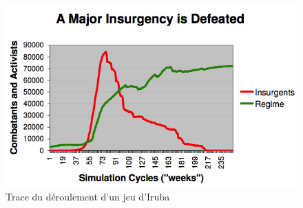 \documentclass{article}
\begin{document}
\begin{figure}[H]
	\begin{centering}
	\includegraphics[width=\linewidth]{../ressources/insurgency}
	\end{centering}
	\caption{Trace du déroulement d'un \og{}jeu\fg{} d'Iruba}
\end{figure}
\end{document}
